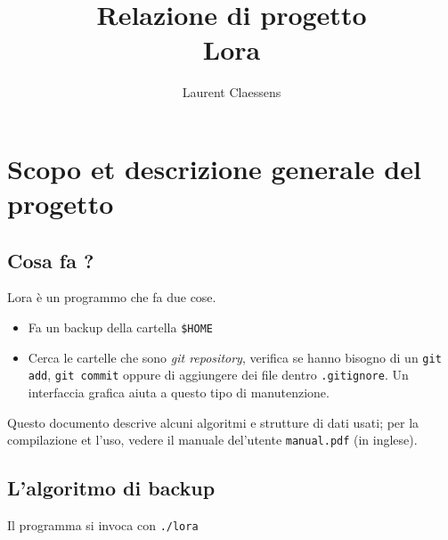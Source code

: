 \documentclass[a4paper,12pt]{article}
\newcommand{\info}[1]{\texttt{#1}}
\begin{document}
\title{Relazione di progetto\\Lora}
\author{Laurent Claessens}
\maketitle

\tableofcontents

\section{Scopo et descrizione generale del progetto}

\subsection{Cosa fa ?}

Lora è un programmo che fa due cose.
\begin{itemize}
    \item
        Fa un backup della cartella \info{\$HOME}
    \item
        Cerca le cartelle che sono \emph{git repository}, verifica se hanno bisogno di un \info{git add}, \info{git commit} oppure di aggiungere dei file dentro \info{.gitignore}. Un interfaccia grafica aiuta a questo tipo di manutenzione.
\end{itemize}
Questo documento descrive alcuni algoritmi e strutture di dati usati; per la compilazione et l'uso, vedere il manuale del'utente \info{manual.pdf} (in inglese).

\subsection{L'algoritmo di backup}

Il programma si invoca con \info{./lora}
\end{document}
